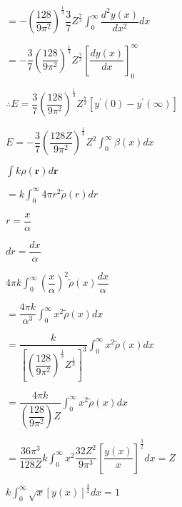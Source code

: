 \documentclass{jarticle}%
\begin{document}
$=-\left(  \dfrac{128}{9\pi^{2}}\right)  ^{\frac{1}{3}}\dfrac{3}{7}Z^{\frac
{7}{3}}%
{\displaystyle\int_{0}^{\infty}}
\dfrac{d^{2}y\left(  x\right)  }{dx^{2}}dx$

$=-\dfrac{3}{7}\left(  \dfrac{128}{9\pi^{2}}\right)  ^{\frac{1}{3}}Z^{\frac
{7}{3}}\left[  \dfrac{dy\left(  x\right)  }{dx}\right]  _{0}^{\infty}$

$\therefore E=\dfrac{3}{7}\left(  \dfrac{128}{9\pi^{2}}\right)  ^{\frac{1}{3}%
}Z^{\frac{7}{3}}\left[  y^{\prime}\left(  0\right)  -y^{\prime}\left(
\infty\right)  \right]  $

$E=-\dfrac{3}{7}\left(  \dfrac{128Z}{9\pi^{2}}\right)  ^{\frac{1}{3}}Z^{2}%
{\displaystyle\int_{0}^{\infty}}
\beta\left(  x\right)  dx$

$%
{\displaystyle\int}
k\rho\left(  \mathbf{r}\right)  d\mathbf{r}$

$=k%
{\displaystyle\int_{0}^{\infty}}
4\pi r^{2}\tilde{\rho}\left(  r\right)  dr$

$r=\dfrac{x}{\alpha}$

$dr=\dfrac{dx}{\alpha}$

$4\pi k%
{\displaystyle\int_{0}^{\infty}}
\left(  \dfrac{x}{\alpha}\right)  ^{2}\tilde{\rho}\left(  x\right)  \dfrac
{dx}{\alpha}$

$=\dfrac{4\pi k}{\alpha^{3}}%
{\displaystyle\int_{0}^{\infty}}
x^{2}\tilde{\rho}\left(  x\right)  dx$

$=\dfrac{k}{\left[  \left(  \dfrac{128}{9\pi^{2}}\right)  ^{\frac{1}{3}%
}Z^{\frac{1}{3}}\right]  ^{3}}%
{\displaystyle\int_{0}^{\infty}}
x^{2}\tilde{\rho}\left(  x\right)  dx$

$=\dfrac{4\pi k}{\left(  \dfrac{128}{9\pi^{2}}\right)  Z}%
{\displaystyle\int_{0}^{\infty}}
x^{2}\tilde{\rho}\left(  x\right)  dx$

$=\dfrac{36\pi^{3}}{128Z}k%
{\displaystyle\int_{0}^{\infty}}
x^{2}\dfrac{32Z^{2}}{9\pi^{3}}\left[  \dfrac{y\left(  x\right)  }{x}\right]
^{\frac{3}{2}}dx=Z$

$k%
{\displaystyle\int_{0}^{\infty}}
\sqrt{x}\left[  y\left(  x\right)  \right]  ^{\frac{3}{2}}dx=1$
\end{document}
